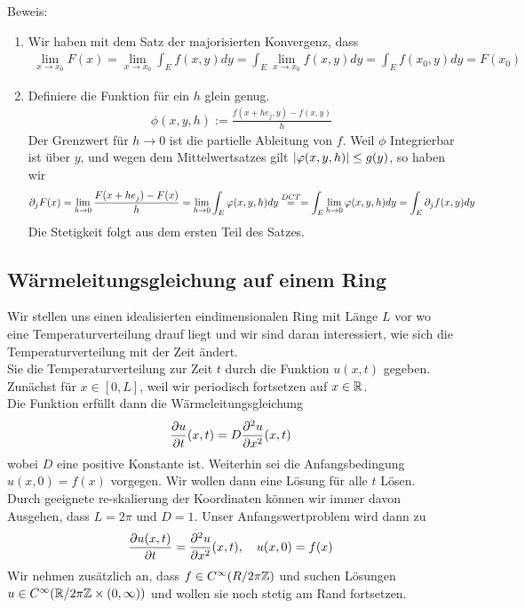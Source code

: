 Beweis: 
\begin{enumerate}
	\item Wir haben mit dem Satz der majorisierten Konvergenz, dass
	\begin{align*}
		\lim_{x \to x_0}F(x) = \lim_{x \to x_0} \int_{E} f(x,y) dy = \int_{E} \lim_{x \to x_0} f(x,y) dy = \int_{E}f(x_0,y) dy = F(x_0)
	\end{align*}
	\item Definiere die Funktion für ein $h$ glein genug.
		\begin{align*}
			\phi(x,y,h) := \frac{f(x + h e_j,y) - f(x,y)}{h}
		\end{align*}
		Der Grenzwert für $h \to 0$ ist die partielle Ableitung von $f$. Weil $\phi$ Integrierbar ist über $y$, und wegen dem Mittelwertsatzes gilt $\vert\varphi(x,y,h)\vert \leq g(y)$, so haben wir
		\begin{align*}
			\partial_j F(x) = \lim_{h \to 0} \frac{F(x + h e_j) - F(x)}{h} = \lim_{h \to 0} \int_{E} \varphi(x,y,h) dy \stackrel{DCT}{=} = \int_{E} \lim_{h \to 0} \varphi(x,y,h) dy = \int_E \partial_j f(x,y) dy
		\end{align*}
		Die Stetigkeit folgt aus dem ersten Teil des Satzes.
\end{enumerate}



\subsection{Wärmeleitungsgleichung auf einem Ring}
Wir stellen uns einen idealisierten eindimensionalen Ring mit Länge $L$ vor wo eine Temperaturverteilung drauf liegt und wir sind daran interessiert, wie sich die Temperaturverteilung mit der Zeit ändert.\\

Sie die Temperaturverteilung zur Zeit $t$ durch die Funktion $u(x,t)$ gegeben. Zunächst für $x \in [0,L]$, weil wir periodisch fortsetzen auf $x \in \mathbb{R}$.\\
Die Funktion erfüllt dann die Wärmeleitungsgleichung
\begin{align*}
	\frac{\partial u}{\partial t}(x,t) = D \frac{\partial^2 u}{\partial x^2}(x,t)
\end{align*}
wobei $D$ eine positive Konstante ist. Weiterhin sei die Anfangsbedingung $u(x,0) = f(x)$ vorgegen. Wir wollen dann eine Lösung für alle $t$ Lösen.\\

Durch geeignete re-skalierung der Koordinaten können wir immer davon Ausgehen, dass $L = 2 \pi$ und $D = 1$. Unser Anfangswertproblem wird dann zu
\begin{align*}
	\frac{\partial u(x,t)}{\partial t} = \frac{\partial^2 u}{\partial x^2}(x,t), \quad u(x,0) = f(x) 
\end{align*}
Wir nehmen zusätzlich an, dass $f \in C^{\infty}(R/2\pi\mathbb{Z})$ und suchen Lösungen $u \in C^{\infty}(\mathbb{R}/2\pi\mathbb{Z} \times (0,\infty))$ und wollen sie noch stetig am Rand fortsetzen.\\

